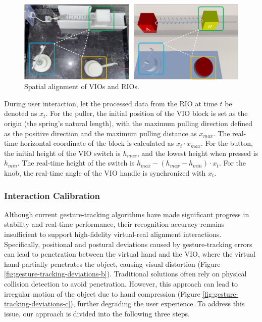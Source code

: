 \documentclass[sigconf,review,anonymous]{acmart}
\begin{document}
\begin{figure}[h]
  \centering
  \includegraphics[width=\linewidth]{image/spaital-alignment.pdf}
  \caption{Spatial alignment of VIOs and RIOs.}
  \label{fig:spaital-alignment}
\end{figure}

During user interaction, let the processed data from the RIO at time $t$ be denoted as $x_{t}$. For the puller, the initial position of the VIO block is set as the origin (the spring's natural length), with the maximum pulling direction defined as the positive direction and the maximum pulling distance as $x_{max}$. The real-time horizontal coordinate of the block is calculated as $x_{t} \cdot x_{max}$. For the button, the initial height of the VIO switch is $h_{max}$, and the lowest height when pressed is $h_{min}$. The real-time height of the switch is $h_{max}-(h_{max}-h_{min}) \cdot x_{t}$. For the knob, the real-time angle of the VIO handle is synchronized with $x_{t}$.

\subsubsection{Interaction Calibration}
Although current gesture-tracking algorithms have made significant progress in stability and real-time performance, their recognition accuracy remains insufficient to support high-fidelity virtual-real alignment interactions. Specifically, positional and postural deviations caused by gesture-tracking errors can lead to penetration between the virtual hand and the VIO, where the virtual hand partially penetrates the object, causing visual distortion (Figure \ref{fig:gesture-tracking-deviations-b}). Traditional solutions often rely on physical collision detection to avoid penetration. However, this approach can lead to irregular motion of the object due to hand compression (Figure \ref{fig:gesture-tracking-deviations-c}), further degrading the user experience. To address this issue, our approach is divided into the following three steps.
\end{document}
